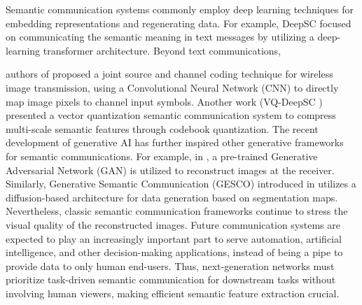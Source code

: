 Semantic communication systems commonly employ deep learning techniques for embedding representations and regenerating data. For example, DeepSC \cite{xie2021deep} focused on communicating the semantic meaning in text messages by utilizing a
deep-learning transformer architecture. 
Beyond text communications, 
\begin{comment}
Recently, AI-powered semantic communication frameworks
have focused on extracting semantic information from  source data for transmission \cite{xie2021deep, xie2020lite, jiang2022deep, weng2021semantic, weng2024semantic, han2022semantic, fu2024generative, pan2023image, wu2024semantic, jiang2022wireless, wang2022wireless, li2024video}. In text
based applications \cite{xie2021deep, xie2020lite, jiang2022deep}, transformer-based architecture, DeepSC, 
allows the receiver to 
recover the meaning of text messages
\cite{xie2021deep}. 
Semantic communication has since expanded to various domains, including speech \cite{weng2021semantic, weng2024semantic, han2022semantic}, image \cite{fu2024generative, pan2023image, wu2024semantic}, and video \cite{jiang2022wireless, wang2022wireless, li2024video}. This work focuses on  semantic 
image communications.
\end{comment}
authors of \cite{bourtsoulatze2019deep} proposed a joint source and channel coding technique for wireless image transmission, using a Convolutional Neural Network (CNN) to directly map image pixels to channel input symbols. Another work (VQ-DeepSC \cite{fu2023vector})
presented a vector quantization semantic 
communication system to compress 
multi-scale semantic features through codebook quantization. 
The recent development of generative AI has further
inspired other generative frameworks for 
semantic communications. For example, in \cite{lokumarambage2023wireless}, a pre-trained Generative Adversarial Network (GAN) is utilized to reconstruct images at the receiver. Similarly, Generative Semantic Communication (GESCO) introduced in \cite{grassucci2023generative} utilizes a diffusion-based architecture for data generation based on segmentation maps.
Nevertheless, classic semantic communication frameworks continue to stress the visual quality of the reconstructed images. Future communication systems are expected to play an increasingly important part to serve automation, artificial intelligence, and other decision-making applications, instead of being a pipe to provide data to only human end-users. Thus, next-generation networks must prioritize task-driven semantic communication for downstream tasks without involving human viewers, making efficient semantic feature extraction crucial.


